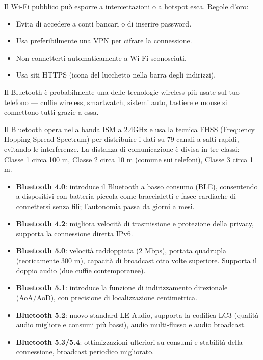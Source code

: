 
Il Wi-Fi pubblico può esporre a intercettazioni o a hotspot esca. Regole d'oro:

\begin{itemize}
  \item Evita di accedere a conti bancari o di inserire password.
  \item Usa preferibilmente una VPN per cifrare la connessione.
  \item Non connetterti automaticamente a Wi-Fi sconosciuti.
  \item Usa siti HTTPS (icona del lucchetto nella barra degli indirizzi).
\end{itemize}


Il Bluetooth è probabilmente una delle tecnologie wireless più usate sul tuo telefono — cuffie wireless, smartwatch, sistemi auto, tastiere e mouse si connettono tutti grazie a essa.


Il Bluetooth opera nella banda ISM a 2.4GHz e usa la tecnica FHSS (Frequency Hopping Spread Spectrum) per distribuire i dati su 79 canali a salti rapidi, evitando le interferenze. La distanza di comunicazione è divisa in tre classi: Classe 1 circa 100 m, Classe 2 circa 10 m (comune sui telefoni), Classe 3 circa 1 m.


\begin{itemize}
  \item \textbf{Bluetooth 4.0}: introduce il Bluetooth a basso consumo (BLE), consentendo a dispositivi con batteria piccola come braccialetti e fasce cardiache di connettersi senza fili; l'autonomia passa da giorni a mesi.
  \item \textbf{Bluetooth 4.2}: migliora velocità di trasmissione e protezione della privacy, supporta la connessione diretta IPv6.
  \item \textbf{Bluetooth 5.0}: velocità raddoppiata (2 Mbps), portata quadrupla (teoricamente 300 m), capacità di broadcast otto volte superiore. Supporta il doppio audio (due cuffie contemporanee).
  \item \textbf{Bluetooth 5.1}: introduce la funzione di indirizzamento direzionale (AoA/AoD), con precisione di localizzazione centimetrica.
  \item \textbf{Bluetooth 5.2}: nuovo standard LE Audio, supporta la codifica LC3 (qualità audio migliore e consumi più bassi), audio multi-flusso e audio broadcast.
  \item \textbf{Bluetooth 5.3/5.4}: ottimizzazioni ulteriori su consumi e stabilità della connessione, broadcast periodico migliorato.
\end{itemize}

